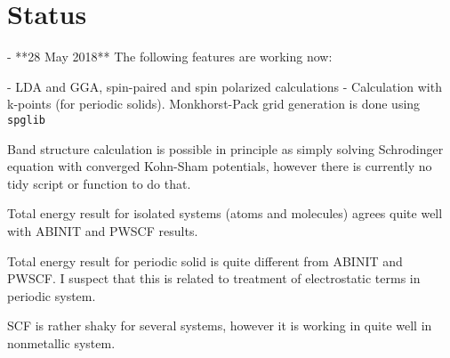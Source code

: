 \section{Status}

\begin{markdown}

- **28 May 2018** The following features are working now:
	
  - LDA and GGA, spin-paired and spin polarized calculations
  - Calculation with k-points (for periodic solids). Monkhorst-Pack grid
    generation is done using \texttt{spglib}
  
  Band structure calculation is possible in principle as simply solving
  Schrodinger equation with converged Kohn-Sham potentials, however there
  is currently no tidy script or function to do that.

  Total energy result for isolated systems (atoms and molecules) agrees quite
  well with ABINIT and PWSCF results.

  Total energy result for periodic solid is quite different from ABINIT and PWSCF.
  I suspect that this is related to treatment of electrostatic terms in periodic system.

  SCF is rather shaky for several systems, however it is working in quite well in nonmetallic
  system.

\end{markdown}
